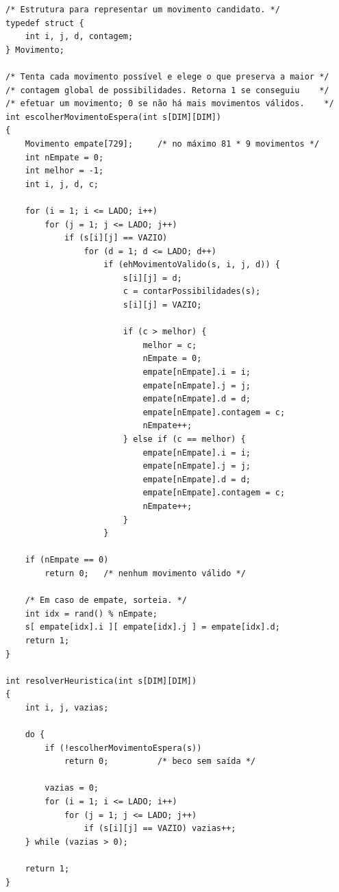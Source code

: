 \documentclass[11pt,a4paper,oneside]{report}
\begin{document}
\begin{lstlisting}[caption={Heurística ``esperar antes de tomar uma decisão''.},label={lst:wait}]
/* Estrutura para representar um movimento candidato. */
typedef struct {
    int i, j, d, contagem;
} Movimento;

/* Tenta cada movimento possível e elege o que preserva a maior */
/* contagem global de possibilidades. Retorna 1 se conseguiu    */
/* efetuar um movimento; 0 se não há mais movimentos válidos.    */
int escolherMovimentoEspera(int s[DIM][DIM])
{
    Movimento empate[729];     /* no máximo 81 * 9 movimentos */
    int nEmpate = 0;
    int melhor = -1;
    int i, j, d, c;

    for (i = 1; i <= LADO; i++)
        for (j = 1; j <= LADO; j++)
            if (s[i][j] == VAZIO)
                for (d = 1; d <= LADO; d++)
                    if (ehMovimentoValido(s, i, j, d)) {
                        s[i][j] = d;
                        c = contarPossibilidades(s);
                        s[i][j] = VAZIO;

                        if (c > melhor) {
                            melhor = c;
                            nEmpate = 0;
                            empate[nEmpate].i = i;
                            empate[nEmpate].j = j;
                            empate[nEmpate].d = d;
                            empate[nEmpate].contagem = c;
                            nEmpate++;
                        } else if (c == melhor) {
                            empate[nEmpate].i = i;
                            empate[nEmpate].j = j;
                            empate[nEmpate].d = d;
                            empate[nEmpate].contagem = c;
                            nEmpate++;
                        }
                    }

    if (nEmpate == 0)
        return 0;   /* nenhum movimento válido */

    /* Em caso de empate, sorteia. */
    int idx = rand() % nEmpate;
    s[ empate[idx].i ][ empate[idx].j ] = empate[idx].d;
    return 1;
}

int resolverHeuristica(int s[DIM][DIM])
{
    int i, j, vazias;

    do {
        if (!escolherMovimentoEspera(s))
            return 0;          /* beco sem saída */

        vazias = 0;
        for (i = 1; i <= LADO; i++)
            for (j = 1; j <= LADO; j++)
                if (s[i][j] == VAZIO) vazias++;
    } while (vazias > 0);

    return 1;
}
\end{lstlisting}
\end{document}
